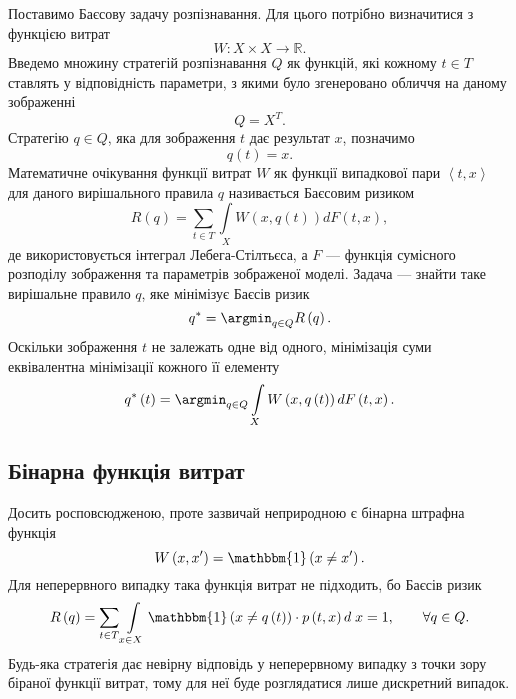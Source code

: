 Поставимо Баєсову задачу розпізнавання.
Для цього потрібно визначитися з функцією витрат
\cite{berger1980}
\begin{equation*}
  W: X \times X \rightarrow \mathbb{R}.
\end{equation*}
Введемо множину стратегій розпізнавання $Q$ як функцій,
які кожному $t \in T$ ставлять у відповідність параметри,
з якими було згенеровано обличчя на даному зображенні
\begin{equation*}
  Q = X^T.
\end{equation*}
Стратегію $q \in Q$, яка для зображення $t$ дає результат $x$, позначимо
\begin{equation*}
  q\left( t \right) = x.
\end{equation*}
Математичне очікування функції витрат $W$
як функції випадкової пари $\left\langle t, x \right\rangle$
для даного вирішального правила $q$ називається Баєсовим ризиком
\cite{schlesinger:2002}
\begin{equation*}
  R \left( q \right)
  = \sum\limits_{t \in T} \int\limits_{X}
    W \left( x, q\left( t \right) \right)
    d F\left( t, x \right),
\end{equation*}
де використовується інтеграл Лебега-Стілтьєса,
а $F$ --- функція сумісного розподілу зображення
та параметрів зображеної моделі.
Задача --- знайти таке вирішальне правило $q$, яке мінімізує Баєсів ризик
\cite{wald1955selected}
\begin{equation*}
  q^* = \argmin_{q \in Q} R\left( q \right).
\end{equation*}
Оскільки зображення $t$ не залежать одне від одного,
мінімізація суми еквівалентна мінімізації кожного її елементу
\begin{equation*}
  q^*\left( t \right) = \argmin_{q \in Q} \int\limits_{X}
    W \left( x, q\left( t \right) \right)
    d F\left( t, x \right).
\end{equation*}

\subsection{Бінарна функція витрат}

Досить росповсюдженою, проте зазвичай неприродною є бінарна штрафна функція
\begin{equation*}
  W \left( x, x' \right)
  = \mathbbm{1} \left( x \neq x' \right).
\end{equation*}
Для неперервного випадку така функція витрат не підходить,
бо Баєсів ризик
\begin{equation*}
  R \left( q \right)
  = \sum\limits_{t \in T}
    \int\limits_{x \in X}
    \mathbbm{1} \left( x \neq q\left( t \right) \right)
    \cdot p\left( t, x \right) d\; x
  = 1,\qquad
  \forall q \in Q.
\end{equation*}
Будь-яка стратегія дає невірну відповідь у неперервному випадку
з точки зору біраної функції витрат,
тому для неї буде розглядатися лише дискретний випадок.

